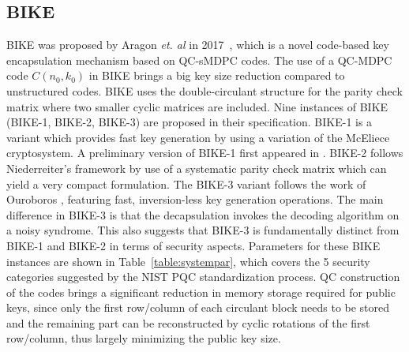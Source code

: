 \documentclass[runningheads]{llncs}
\begin{document}
\subsection{BIKE}
%
BIKE was proposed by Aragon \textit{et. al} in 2017~\cite{aragon2017bike},
which is a novel code-based key encapsulation mechanism based on QC-sMDPC codes.
The use of a QC-MDPC code $C(n_0,k_0)$ in BIKE brings a big key size reduction
compared to unstructured codes.
BIKE uses the double-circulant structure for the parity check matrix
where two smaller cyclic matrices are included.
Nine instances of BIKE (BIKE-1, BIKE-2, BIKE-3) are proposed
in their specification.
BIKE-1 is a variant which provides fast key generation
by using a variation of the McEliece cryptosystem.
A preliminary version of BIKE-1 first appeared in \cite{barreto2017cake}.
BIKE-2 follows Niederreiter's framework by use of
a systematic parity check matrix which can yield a very compact formulation.
The BIKE-3 variant follows the work of Ouroboros \cite{deneuville2017ouroboros}, featuring fast, inversion-less key generation operations.
The main difference in BIKE-3 is that the decapsulation invokes the decoding algorithm on a noisy syndrome. This also suggests that BIKE-3 is fundamentally distinct from BIKE-1 and BIKE-2 in terms of security aspects.
Parameters for these BIKE instances are shown in Table~\ref{table:systempar},
which covers the 5 security categories suggested by the NIST PQC standardization process.
QC construction of the codes brings a significant reduction
in memory storage required for public keys,
since only the first row/column of each circulant block
needs to be stored and the remaining part can be
reconstructed by cyclic rotations of the first row/column,
thus largely minimizing the public key size. %
\end{document}
